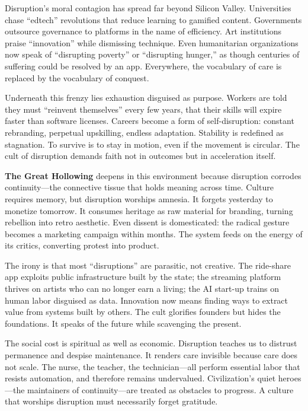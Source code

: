 \documentclass[11pt,twoside]{book}
\begin{document}
Disruption’s moral contagion has spread far beyond Silicon Valley.  Universities chase “edtech” revolutions that reduce learning to gamified content.  Governments outsource governance to platforms in the name of efficiency.  Art institutions praise “innovation” while dismissing technique.  Even humanitarian organizations now speak of “disrupting poverty” or “disrupting hunger,” as though centuries of suffering could be resolved by an app.  Everywhere, the vocabulary of care is replaced by the vocabulary of conquest.

Underneath this frenzy lies exhaustion disguised as purpose.  Workers are told they must “reinvent themselves” every few years, that their skills will expire faster than software licenses.  Careers become a form of self-disruption: constant rebranding, perpetual upskilling, endless adaptation.  Stability is redefined as stagnation.  To survive is to stay in motion, even if the movement is circular.  The cult of disruption demands faith not in outcomes but in acceleration itself.

\textbf{The Great Hollowing} deepens in this environment because disruption corrodes continuity—the connective tissue that holds meaning across time.  Culture requires memory, but disruption worships amnesia.  It forgets yesterday to monetize tomorrow.  It consumes heritage as raw material for branding, turning rebellion into retro aesthetic.  Even dissent is domesticated: the radical gesture becomes a marketing campaign within months.  The system feeds on the energy of its critics, converting protest into product.

The irony is that most “disruptions” are parasitic, not creative.  The ride-share app exploits public infrastructure built by the state; the streaming platform thrives on artists who can no longer earn a living; the AI start-up trains on human labor disguised as data.  Innovation now means finding ways to extract value from systems built by others.  The cult glorifies founders but hides the foundations.  It speaks of the future while scavenging the present.

The social cost is spiritual as well as economic.  Disruption teaches us to distrust permanence and despise maintenance.  It renders care invisible because care does not scale.  The nurse, the teacher, the technician—all perform essential labor that resists automation, and therefore remains undervalued.  Civilization’s quiet heroes—the maintainers of continuity—are treated as obstacles to progress.  A culture that worships disruption must necessarily forget gratitude.
\end{document}
